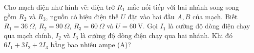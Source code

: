 \begin{ex}
Cho mạch điện như hình vẽ: điện trở $R_1$ mắc nối tiếp với hai nhánh song song gồm $R_2$ và $R_3$, nguồn có hiệu điện thế $U$ đặt vào hai đầu $A,B$ của mạch. Biết $R_1=36\ \Omega$, $R_2=90\ \Omega$, $R_3=60\ \Omega$ và $U=60\ \mathrm V$. Gọi $I_1$ là cường độ dòng điện chạy qua mạch chính, $I_2$ và $I_3$ là cường độ dòng điện chạy qua hai nhánh. Khi đó $6I_1+3I_2+2I_3$ bằng bao nhiêu ampe (A)?
\end{ex}
